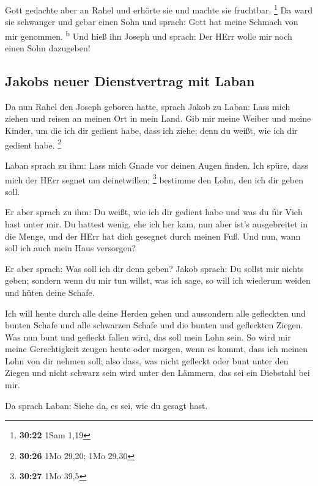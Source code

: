  Gott gedachte aber an Rahel und erhörte sie und machte
sie fruchtbar. \footnote{\textbf{30:22} 1Sam 1,19}  Da
ward sie schwanger und gebar einen Sohn und sprach: Gott hat meine
Schmach von mir genommen. \textsuperscript{b}  Und hieß
ihn Joseph und sprach: Der HErr wolle mir noch einen Sohn dazugeben!

\hypertarget{jakobs-neuer-dienstvertrag-mit-laban}{%
\subsection{Jakobs neuer Dienstvertrag mit
Laban}\label{jakobs-neuer-dienstvertrag-mit-laban}}

 Da nun Rahel den Joseph geboren hatte, sprach Jakob zu
Laban: Lass mich ziehen und reisen an meinen Ort in mein Land.
 Gib mir meine Weiber und meine Kinder, um die ich dir
gedient habe, dass ich ziehe; denn du weißt, wie ich dir gedient habe.
\footnote{\textbf{30:26} 1Mo 29,20; 1Mo 29,30}

 Laban sprach zu ihm: Lass mich Gnade vor deinen Augen
finden. Ich spüre, dass mich der HErr segnet um deinetwillen;
\footnote{\textbf{30:27} 1Mo 39,5}  bestimme den Lohn,
den ich dir geben soll.

 Er aber sprach zu ihm: Du weißt, wie ich dir gedient
habe und was du für Vieh hast unter mir.  Du hattest
wenig, ehe ich her kam, nun aber ist's ausgebreitet in die Menge, und
der HErr hat dich gesegnet durch meinen Fuß. Und nun, wann soll ich auch
mein Haus versorgen?

 Er aber sprach: Was soll ich dir denn geben? Jakob
sprach: Du sollst mir nichts geben; sondern wenn du mir tun willst, was
ich sage, so will ich wiederum weiden und hüten deine Schafe.

 Ich will heute durch alle deine Herden gehen und
aussondern alle gefleckten und bunten Schafe und alle schwarzen Schafe
und die bunten und gefleckten Ziegen. Was nun bunt und gefleckt fallen
wird, das soll mein Lohn sein.  So wird mir meine
Gerechtigkeit zeugen heute oder morgen, wenn es kommt, dass ich meinen
Lohn von dir nehmen soll; also dass, was nicht gefleckt oder bunt unter
den Ziegen und nicht schwarz sein wird unter den Lämmern, das sei ein
Diebstahl bei mir.

 Da sprach Laban: Siehe da, es sei, wie du gesagt hast.

